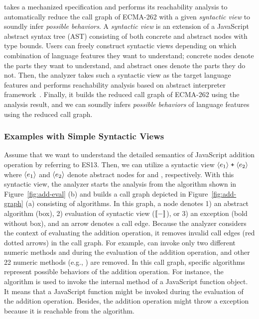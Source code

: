  takes a mechanized specification and performs its
reachability analysis to automatically reduce the call graph of ECMA-262 with a
given \textit{syntactic view} to soundly infer \textit{possible behaviors}.  A
\textit{syntactic view} is an extension of a JavaScript abstract syntax tree
(AST) consisting of both concrete and abstract nodes with type bounds.
Users can freely construct syntactic views depending on which combination of
language features they want to understand; concrete nodes denote the parts they
want to understand, and abstract ones denote the parts they do not.  Then, the
analyzer takes such a syntactic view as the target language features and
performs reachability analysis based on abstract interpreter
framework~\cite{ai1977, ai1992}.  Finally, it builds the reduced call graph of
ECMA-262 using the analysis result, and we can soundly infers \textit{possible
behaviors} of language features using the reduced call graph.


\subsubsection{Examples with Simple Syntactic Views}

Assume that we want to understand the detailed semantics of JavaScript addition
operation by referring to ES13.  Then, we can utilize a syntactic view
$\svhole{\expr_1} \; \code{+} \; \svhole{\expr_2}$ where $\langle e_1 \rangle$ and
$\langle e_2 \rangle$ denote abstract nodes for  and
, respectively.  With this syntactic view, the
analyzer starts the analysis from the  algorithm shown in
Figure~\ref{fig:add-eval} (b) and builds a call graph depicted in
Figure~\ref{fig:add-graph} (a) consisting of  algorithms.  In this
graph, a node denotes 1) an abstract algorithm (box), 2) evaluation of syntactic
view ($\llbracket{-}\rrbracket$), or 3) an exception (bold without box), and an arrow denotes a
call edge.  Because the analyzer considers the context of evaluating the
addition operation, it removes invalid call edges (red dotted arrows) in the
call graph.  For example,  can invoke
only two different numeric methods  and 
during the evaluation of the addition operation, and other 22 numeric methods
(e.g., ) are removed.  In this call graph, specific
algorithms represent possible behaviors of the addition operation.  For
instance, the  algorithm is used to invoke the \eswrd{[[Call]]}
internal method of a JavaScript function object.  It means that a JavaScript
function might be invoked during the evaluation of the addition operation.
Besides, the addition operation might throw a  exception
because it is reachable from the  algorithm.


